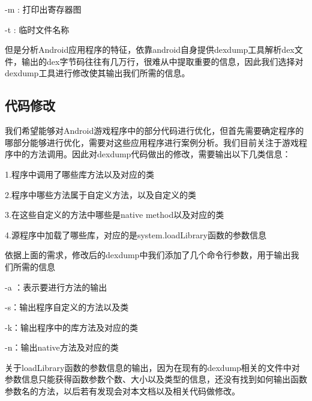 -m :  打印出寄存器图

-t : 临时文件名称

但是分析Android应用程序的特征，依靠android自身提供dexdump工具解析dex文件，输出的dex字节码往往有几万行，很难从中提取重要的信息，因此我们选择对dexdump工具进行修改使其输出我们所需的信息。

\subsection{代码修改}
我们希望能够对Android游戏程序中的部分代码进行优化，但首先需要确定程序的哪部分能够进行优化，需要对这些应用程序进行案例分析。我们目前关注于游戏程序中的方法调用。因此对dexdump代码做出的修改，需要输出以下几类信息：

1.程序中调用了哪些库方法以及对应的类

2.程序中哪些方法属于自定义方法，以及自定义的类

3.在这些自定义的方法中哪些是native method以及对应的类

4.源程序中加载了哪些库，对应的是system.loadLibrary函数的参数信息

依据上面的需求，修改后的dexdump中我们添加了几个命令行参数，用于输出我们所需的信息

-a ：表示要进行方法的输出

-s：输出程序自定义的方法以及类

-k：输出程序中的库方法及对应的类

-n：输出native方法及对应的类

关于loadLibrary函数的参数信息的输出，因为在现有的dexdump相关的文件中对参数信息只能获得函数参数个数、大小以及类型的信息，还没有找到如何输出函数参数名的方法，以后若有发现会对本文档以及相关代码做修改。






